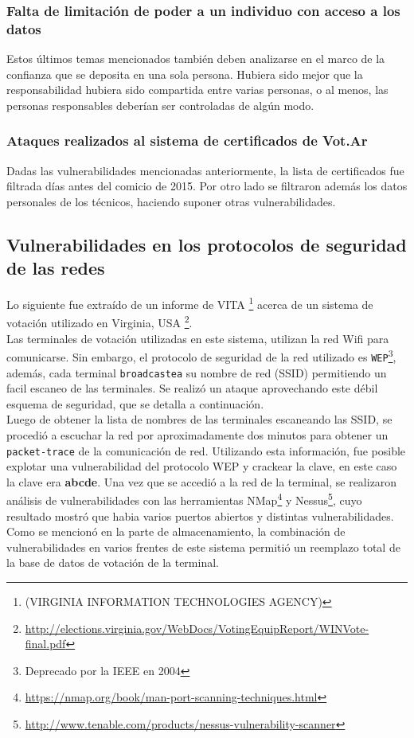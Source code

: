 \subsubsection{Falta de limitación de poder a un individuo con acceso a los datos}

Estos últimos temas mencionados también deben analizarse en el marco de la confianza que se deposita en una sola persona. Hubiera sido mejor que la responsabilidad hubiera sido compartida entre varias personas, o al menos, las personas responsables deberían ser controladas de algún modo.

\subsubsection{Ataques realizados al sistema de certificados de Vot.Ar}
Dadas las vulnerabilidades mencionadas anteriormente, la lista de certificados fue filtrada días antes del comicio de 2015. Por otro lado se filtraron además los datos personales de los técnicos, haciendo suponer otras vulnerabilidades.

\subsection{Vulnerabilidades en los protocolos de seguridad de las redes}
Lo siguiente fue extraído de un informe de VITA \footnote{(VIRGINIA INFORMATION TECHNOLOGIES AGENCY)} acerca de un sistema de votación utilizado en Virginia, USA \footnote{\url{http://elections.virginia.gov/WebDocs/VotingEquipReport/WINVote-final.pdf}}.\\
Las terminales de votación utilizadas en este sistema, utilizan la red Wifi para comunicarse. Sin embargo, el protocolo de seguridad de la red utilizado es \texttt{WEP}\footnote{Deprecado por la IEEE en 2004}, además, cada terminal \texttt{broadcastea} su nombre de red (SSID) permitiendo un facil escaneo de las terminales. Se realizó un ataque aprovechando este débil esquema de seguridad, que se detalla a continuación.\\
Luego de obtener la lista de nombres de las terminales escaneando las SSID, se procedió a escuchar la red por aproximadamente dos minutos para obtener un \texttt{packet-trace} de la comunicación de red. Utilizando esta información, fue posible explotar una vulnerabilidad del protocolo WEP y crackear la clave, en este caso la clave era \textbf{abcde}. Una vez que se accedió a la red de la terminal, se realizaron análisis de vulnerabilidades con las herramientas NMap\footnote{\url{https://nmap.org/book/man-port-scanning-techniques.html}} y Nessus\footnote{\url{http://www.tenable.com/products/nessus-vulnerability-scanner}}, cuyo resultado mostró que habia varios puertos abiertos y distintas vulnerabilidades. Como se mencionó en la parte de almacenamiento, la combinación de vulnerabilidades en varios frentes de este sistema permitió un reemplazo total de la base de datos de votación de la terminal.

